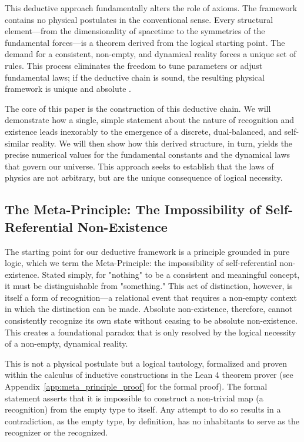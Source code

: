 This deductive approach fundamentally alters the role of axioms. The framework contains no physical postulates in the conventional sense. Every structural element—from the dimensionality of spacetime to the symmetries of the fundamental forces—is a theorem derived from the logical starting point. The demand for a consistent, non-empty, and dynamical reality forces a unique set of rules. This process eliminates the freedom to tune parameters or adjust fundamental laws; if the deductive chain is sound, the resulting physical framework is unique and absolute \parencite{Tegmark2008, Baez2009}.

The core of this paper is the construction of this deductive chain. We will demonstrate how a single, simple statement about the nature of recognition and existence leads inexorably to the emergence of a discrete, dual-balanced, and self-similar reality. We will then show how this derived structure, in turn, yields the precise numerical values for the fundamental constants and the dynamical laws that govern our universe. This approach seeks to establish that the laws of physics are not arbitrary, but are the unique consequence of logical necessity.

\subsection{The Meta-Principle: The Impossibility of Self-Referential Non-Existence}
The starting point for our deductive framework is a principle grounded in pure logic, which we term the Meta-Principle: the impossibility of self-referential non-existence. Stated simply, for "nothing" to be a consistent and meaningful concept, it must be distinguishable from "something." This act of distinction, however, is itself a form of recognition—a relational event that requires a non-empty context in which the distinction can be made. Absolute non-existence, therefore, cannot consistently recognize its own state without ceasing to be absolute non-existence. This creates a foundational paradox that is only resolved by the logical necessity of a non-empty, dynamical reality.

This is not a physical postulate but a logical tautology, formalized and proven within the calculus of inductive constructions in the Lean 4 theorem prover (see Appendix~\ref{app:meta_principle_proof} for the formal proof). The formal statement asserts that it is impossible to construct a non-trivial map (a recognition) from the empty type to itself. Any attempt to do so results in a contradiction, as the empty type, by definition, has no inhabitants to serve as the recognizer or the recognized.

